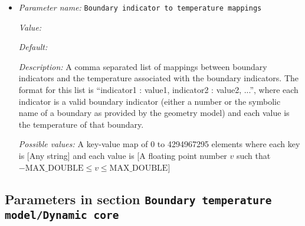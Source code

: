\begin{itemize}
\item {\it Parameter name:} {\tt Boundary indicator to temperature mappings}
\label{parameters:Boundary temperature model/Constant/Boundary indicator to temperature mappings}


{\it Value:} 


{\it Default:} 


{\it Description:} A comma separated list of mappings between boundary indicators and the temperature associated with the boundary indicators. The format for this list is ``indicator1 : value1, indicator2 : value2, ...'', where each indicator is a valid boundary indicator (either a number or the symbolic name of a boundary as provided by the geometry model) and each value is the temperature of that boundary.


{\it Possible values:} A key-value map of 0 to 4294967295 elements  where each key is [Any string] and each value is [A floating point number $v$ such that $-\text{MAX\_DOUBLE} \leq v \leq \text{MAX\_DOUBLE}$]
\end{itemize}

\subsection{Parameters in section \tt Boundary temperature model/Dynamic core}
\label{parameters:Boundary_20temperature_20model/Dynamic_20core}

